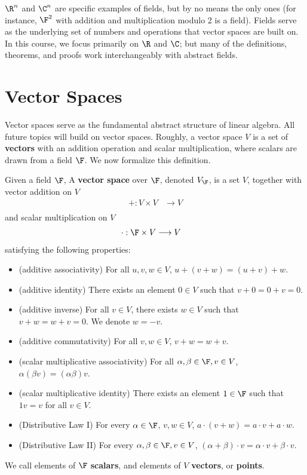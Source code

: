\documentclass[math0540-lecture-notes.tex]{subfiles}
\begin{document}
$\R^{n}$ and $\C^{n}$ are specific examples of fields, but by no means the only ones (for instance,
$\F^{2}$ with addition and multiplication modulo 2 is a field). Fields serve as the underlying set
of numbers and operations that vector spaces are built on. In this course, we focus primarily on
$\R$ and $\C$; but many of the definitions, theorems, and proofs work interchangeably with abstract
fields.



\section{Vector Spaces}
Vector spaces serve as the fundamental abstract structure of linear algebra. All future topics will
build on vector spaces. Roughly, a vector space $V$ is a set of \textbf{vectors} with an addition
operation and scalar multiplication, where scalars are drawn from a field $\F$. We now formalize
this definition.
\begin{definition}{}
  Given a field $\F$, A \textbf{vector space} over $\F$, denoted $V_\F$, is a set $V$, together with
  vector addition on $V$ \begin{align*}
    +: V\times V &\longrightarrow V\\
  \end{align*} and scalar multiplication on $V$ \begin{align*}
    \cdot : \F\times V &\longrightarrow V
  \end{align*} satisfying the following properties:
  \begin{itemize}
    \item (additive associativity) For all $u,v,w\in V$, $u+(v+w)=(u+v)+w$.
    \item (additive identity) There exists an element $0\in V$ such that $v+0=0+v=0$.
    \item (additive inverse) For all $v\in V$, there exists $w\in V$ such that $v+w=w+v=0$. We
      denote $w=-v$.
    \item (additive commutativity) For all $v,w\in V$, $v+w=w+v$.
    \item (scalar multiplicative associativity) For all $ \alpha,\beta\in \F, v\in V$,
      $\alpha(\beta v)=(\alpha\beta)v$.
    \item (scalar multiplicative identity) There exists an element $1\in \F$ such that $1v=v$ for
      all  $v\in V$.
    \item (Distributive Law I) For every $ \alpha\in \F$, $v,w\in V$, $a\cdot (v+w)=a\cdot v+a\cdot
      w$.
    \item (Distributive Law II) For every $\alpha,\beta\in \F, v\in V$, $(\alpha+\beta)\cdot
      v=\alpha\cdot v+\beta\cdot v$.
  \end{itemize}
  We call elements of $\F$ \textbf{scalars}, and elements of $V$ \textbf{vectors}, or
  \textbf{points}.
\end{definition}
\end{document}
